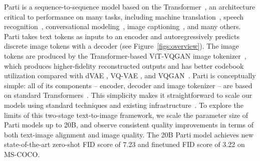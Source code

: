 Parti is a sequence-to-sequence model based on the Transformer~\cite{vaswani2017attention}, an architecture critical to performance on many tasks, including machine translation~\cite{vaswani2017attention}, speech recognition~\cite{zhang2020transformer, gulati2020conformer}, conversational modeling~\cite{meena}, image captioning~\cite{yu2022coca}, and many others. Parti takes text tokens as inputs to an encoder and autoregressively predicts discrete image tokens with a decoder (see Figure~\ref{figs:overview}).
The image tokens are produced by the Transformer-based ViT-VQGAN image tokenizer~\cite{yu2021vector}, which produces higher-fidelity reconstructed outputs and has better codebook utilization compared with dVAE \cite{rolfe2016discrete}, VQ-VAE \cite{van2017neural}, and VQGAN~\cite{Esser21vqgan}. Parti is conceptually simple: all of its components -- encoder, decoder and image tokenizer -- are based on standard Transformers~\cite{vaswani2017attention}. This simplicity makes it straightforward to scale our models using standard techniques and existing infrastructure~\cite{megatron, du2021glam, palm, xu2021gspmd}. To explore the limits of this two-stage text-to-image framework, we scale the parameter size of Parti models up to 20B, and observe consistent quality improvements in terms of both text-image alignment and image quality. The 20B Parti model achieves new state-of-the-art zero-shot FID score of 7.23 and finetuned FID score of 3.22 on MS-COCO.

